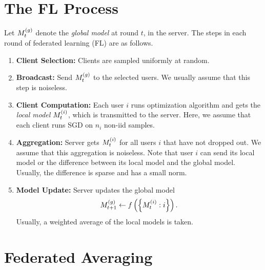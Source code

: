 \documentclass[twoside]{article}
\begin{document}



\section{The FL Process}

Let \(M_t^{\left(g\right)}\) denote the \emph{global model} at round \(t\), in the 
server. The steps in each round of federated learning (FL) are as follows.

\begin{enumerate}
    \item \textbf{Client Selection:} Clients are sampled uniformly at random.
    \item \textbf{Broadcast:} Send \(M_t^{\left(g\right)}\) to the selected users.
    We usually assume that this step is noiseless.
    \item \textbf{Client Computation:} Each user \(i\) runs optimization 
    algorithm and gets the \emph{local model} \(M_t^{\left(i\right)}\), which is
    transmitted to the server. Here, we assume that each client runs SGD
    on \(n_i\) non-iid samples.
    \item \textbf{Aggregation:} Server gets \(M_t^{\left(i\right)}\) for all users
    \(i\) that have not dropped out. We assume that this aggregation is 
    noiseless. Note that user \(i\) can send its local model or the 
    difference between its local model and the global model. Usually, the
    difference is sparse and has a small norm.
    \item \textbf{Model Update:} Server updates the global model
    \begin{equation}
        M_{t+1}^{\left(g\right)} \leftarrow f\left(\left\{M_t^{\left(i\right)}:i\right\}\right).
        \label{eq:update-gen}
    \end{equation}
    Usually, a weighted average of the local models is taken.
\end{enumerate}

\section{Federated Averaging}
\end{document}
